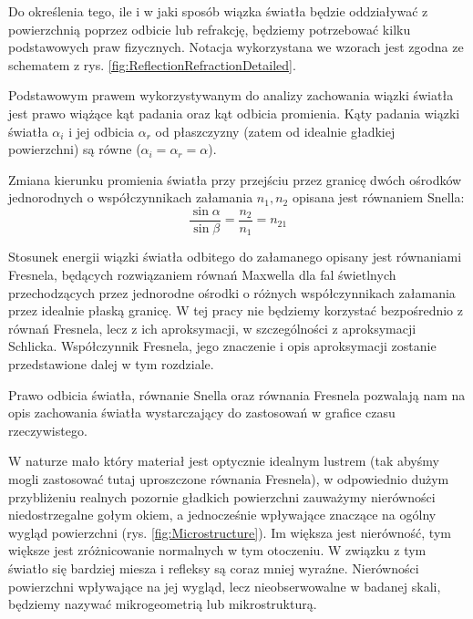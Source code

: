\documentclass[../main.tex]{subfiles}
\begin{document}
Do określenia tego, ile i w jaki sposób wiązka światła będzie oddziaływać z powierzchnią poprzez odbicie lub refrakcję, będziemy potrzebować kilku podstawowych praw fizycznych. Notacja wykorzystana we wzorach jest zgodna ze schematem z rys. \ref{fig:ReflectionRefractionDetailed}.

Podstawowym prawem wykorzystywanym do analizy zachowania wiązki światła jest prawo wiążące kąt padania oraz kąt odbicia promienia. Kąty padania wiązki światła $\alpha_i$ i jej odbicia $\alpha_r$ od płaszczyzny (zatem od idealnie gładkiej powierzchni) są równe ($\alpha_i = \alpha_r = \alpha$).


Zmiana kierunku promienia światła przy przejściu przez granicę dwóch ośrodków jednorodnych o współczynnikach załamania $n_1, n_2$ opisana jest równaniem Snella:
\[
\frac{\sin\alpha}{\sin\beta} =
  \frac{n_2}{n_1} = n_{21}
\]

Stosunek energii wiązki światła odbitego do załamanego opisany jest równaniami Fresnela, będących rozwiązaniem równań Maxwella dla fal świetlnych przechodzących przez jednorodne ośrodki o różnych współczynnikach załamania przez idealnie płaską granicę. W tej pracy nie będziemy korzystać bezpośrednio z równań Fresnela, lecz z ich aproksymacji, w szczególności z aproksymacji Schlicka. Współczynnik Fresnela, jego znaczenie i opis aproksymacji zostanie przedstawione dalej w tym rozdziale.

Prawo odbicia światła, równanie Snella oraz równania Fresnela pozwalają nam na opis zachowania światła wystarczający do zastosowań w grafice czasu rzeczywistego.

W naturze mało który materiał jest optycznie idealnym lustrem (tak abyśmy mogli zastosować tutaj uproszczone równania Fresnela), w odpowiednio dużym przybliżeniu realnych pozornie gładkich powierzchni zauważymy nierówności niedostrzegalne gołym okiem, a jednocześnie wpływające znaczące na ogólny wygląd powierzchni (rys. \ref{fig:Microstructure}). Im większa jest nierówność, tym większe jest zróżnicowanie normalnych w tym otoczeniu. W związku z tym światło się bardziej miesza i refleksy są coraz mniej wyraźne. Nierówności powierzchni wpływające na jej wygląd, lecz nieobserwowalne w badanej skali, będziemy nazywać mikrogeometrią lub mikrostrukturą.
\end{document}

